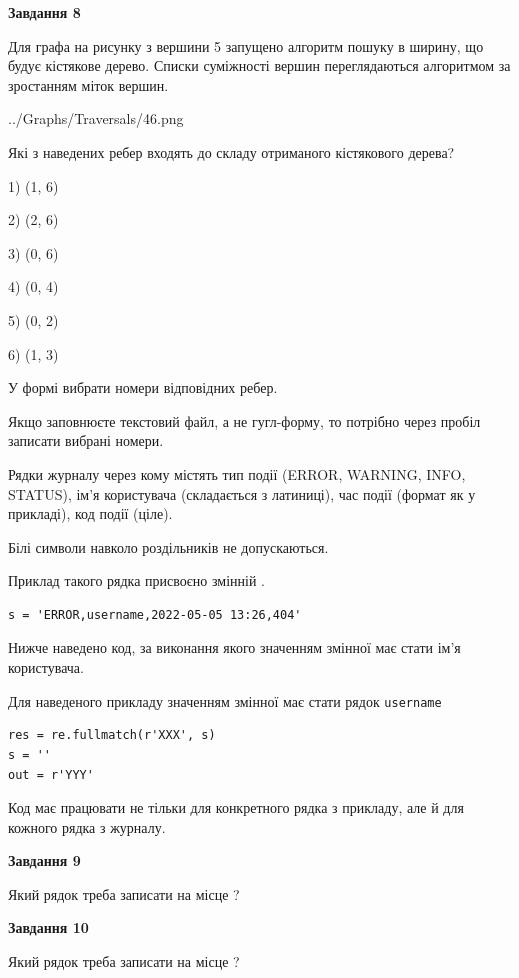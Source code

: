 \documentclass[12pt, ukrainian]{article}
\def\code#1{\Verb!#1!}
\begin{document}
{\begin {large}
{\begin {center}\textbf{Завдання 8}\end {center}}\par
Для графа на рисунку з вершини 5 запущено алгоритм пошуку в ширину, що будує кістякове дерево. Списки суміжності вершин переглядаються алгоритмом за зростанням міток вершин.\par
\begin{center}
	{../Graphs/Traversals/46.png}
\end{center}
\par Які з наведених ребер входять до складу отриманого кістякового дерева?\par
1) (1, 6)\par
2) (2, 6)\par
3) (0, 6)\par
4) (0, 4)\par
5) (0, 2)\par
6) (1, 3)\par
{\vskip 15pt} У формі вибрати номери відповідних ребер.


Якщо заповнюєте текстовий файл, а не гугл-форму, то потрібно через пробіл записа\-ти вибрані номери.\par
\newpage


Рядки журналу через кому містять тип події (ERROR, WARNING, INFO, STATUS), ім'я користувача (складається з латиниці), час події (фор\-мат як у прикладі), код події (ціле).

Білі символи навколо роздільників не допускаються.

Приклад такого рядка присвоєно змінній .



\begin{verbatim}
s = 'ERROR,username,2022-05-05 13:26,404'
\end{verbatim}


Нижче наведено код, за виконання якого значенням змінної  має стати ім'я користувача.

Для наведеного прикладу значенням змінної  має стати рядок \code{username}



\begin{verbatim}
res = re.fullmatch(r'XXX', s)
s = ''
out = r'YYY'
\end{verbatim}


Код має працювати не тільки для конкретного рядка з прикладу, але й для кожного рядка з журналу.

{\begin {center}\textbf{Завдання 9}\end {center}}\par
Який рядок треба записати на місце  ?\par
\vspace{5mm}


{\begin {center}\textbf{Завдання 10}\end {center}}\par
Який рядок треба записати на місце  ?\par


\newpage


\end {large}}
\end{document}
